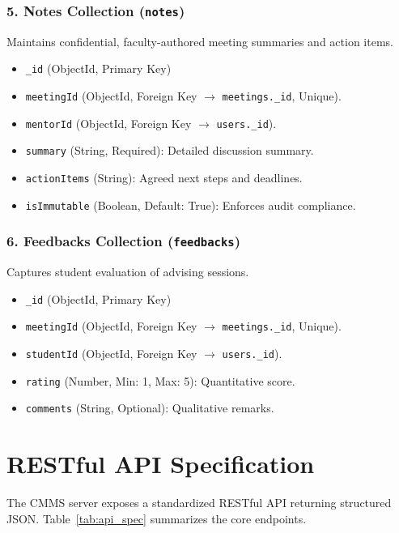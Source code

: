 \documentclass[11pt,a4paper]{article}
\begin{document}
\subsubsection{5. Notes Collection (\texttt{notes})}
Maintains confidential, faculty-authored meeting summaries and action items.
\begin{itemize}[leftmargin=1.4em, itemsep=0.15em]
  \item \texttt{\_id} (ObjectId, Primary Key)
  \item \texttt{meetingId} (ObjectId, Foreign Key $\rightarrow$ \texttt{meetings.\_id}, Unique).
  \item \texttt{mentorId} (ObjectId, Foreign Key $\rightarrow$ \texttt{users.\_id}).
  \item \texttt{summary} (String, Required): Detailed discussion summary.
  \item \texttt{actionItems} (String): Agreed next steps and deadlines.
  \item \texttt{isImmutable} (Boolean, Default: True): Enforces audit compliance.
\end{itemize}

\subsubsection{6. Feedbacks Collection (\texttt{feedbacks})}
Captures student evaluation of advising sessions.
\begin{itemize}[leftmargin=1.4em, itemsep=0.15em]
  \item \texttt{\_id} (ObjectId, Primary Key)
  \item \texttt{meetingId} (ObjectId, Foreign Key $\rightarrow$ \texttt{meetings.\_id}, Unique).
  \item \texttt{studentId} (ObjectId, Foreign Key $\rightarrow$ \texttt{users.\_id}).
  \item \texttt{rating} (Number, Min: 1, Max: 5): Quantitative score.
  \item \texttt{comments} (String, Optional): Qualitative remarks.
\end{itemize}

\section{RESTful API Specification}
The CMMS server exposes a standardized RESTful API returning structured JSON. Table~\ref{tab:api_spec} summarizes the core endpoints.
\end{document}
